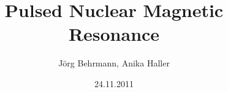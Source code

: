 \documentclass{a4paper,twoside,11pt}[scrartcl]
\begin{document}
\title{Pulsed Nuclear Magnetic Resonance}
\author{J\"org Behrmann, Anika Haller}
\date{24.11.2011}
\maketitle
\tableofcontents
\thispagestyle{empty}
\cleardoublepage

\end{document}
